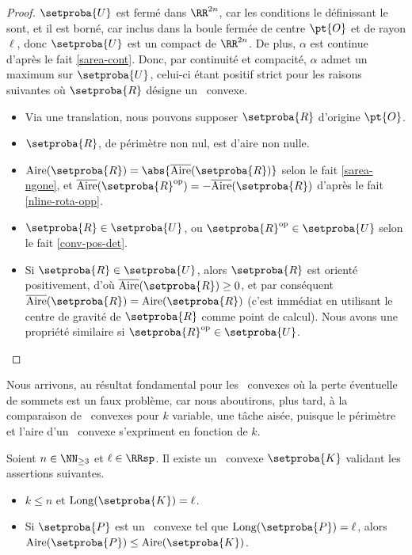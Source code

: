 \begin{proof}
     $\setproba{U}$ est fermé dans $\RR^{2n}$, car les conditions le définissant le sont, et il est borné, car inclus dans la boule fermée de centre $\pt{O}$ et de rayon $\ell$,
     donc $\setproba{U}$ est un compact de $\RR^{2n}$.
     De plus, $\alpha$ est continue d'après le fait \ref{sarea-cont}.
     Donc, par continuité et compacité, $\alpha$ admet un maximum sur $\setproba{U}$, celui-ci étant positif strict pour les raisons suivantes où $\setproba{R}$ désigne un \nreg\ convexe.
    \begin{itemize}
		\item Via une translation, nous pouvons supposer $\setproba{R}$ d'origine $\pt{O}$.


        \item $\setproba{R}$, de périmètre non nul, est d'aire non nulle.

        \item $\area{\setproba{R}} = \abs{\sarea{\setproba{R}}}$
		selon le fait \ref{sarea-ngone},
		et
		$\sarea{\setproba{R}^{\mathrm{op}}} = - \sarea{\setproba{R}}$ d'après le fait \ref{nline-rota-opp}.
		
		\item $\setproba{R} \in \setproba{U}$, ou $\setproba{R}^{\mathrm{op}} \in \setproba{U}$ selon le fait \ref{conv-pos-det}.
		
		\item Si $\setproba{R} \in \setproba{U}$, alors 
		$\setproba{R}$ est orienté positivement, 
		d'où $\sarea{\setproba{R}} \geq 0$, 
		et par conséquent $\sarea{\setproba{R}} = \area{\setproba{R}}$ 
		(c'est immédiat en utilisant le centre de gravité de $\setproba{R}$ comme point de calcul). 
		Nous avons une propriété similaire si $\setproba{R}^{\mathrm{op}} \in \setproba{U}$.
    \end{itemize}

	\null\vspace{-6ex}
\end{proof}




Nous arrivons, au résultat fondamental pour les \ngones\ convexes où la perte éventuelle de sommets est un faux problème, car nous aboutirons, plus tard, à la comparaison de \kregs\ convexes pour $k$ variable, une tâche aisée, puisque le périmètre et l'aire d'un \kreg\ convexe s'expriment en fonction de $k$.


\begin{fact} \label{at-least-one-kgone}
    Soient $n \in \NN_{\geq3}$ et $\ell \in \RRsp$.
    Il existe un \kgone\ convexe $\setproba{K}$ validant les assertions suivantes.
	\begin{itemize}
		\item $k \leq n$ et $\cyclelen{\setproba{K}} = \ell$.

		\item Si $\setproba{P}$ est un \ngone\ convexe tel que $\cyclelen{\setproba{P}} = \ell$, alors $\area{\setproba{P}} \leq \area{\setproba{K}}$.
    \end{itemize}
\end{fact}


